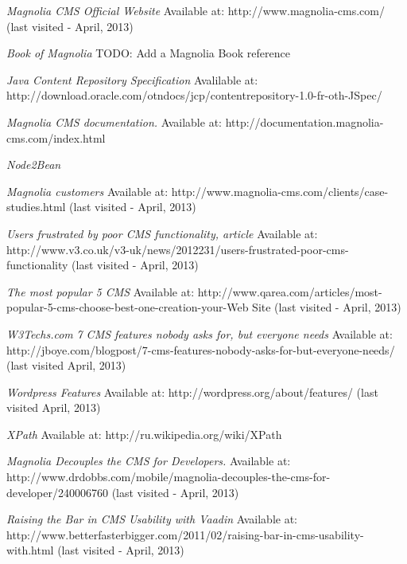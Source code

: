 \begin{thebibliography}{9}

\emph{Magnolia CMS Official Website}
Available at: http://www.magnolia-cms.com/ (last visited - April, 2013)

\emph{Book of Magnolia}
TODO: Add a Magnolia Book reference

\emph{Java Content Repository Specification}
Avalilable at: http://download.oracle.com/otndocs/jcp/contentrepository-1.0-fr-oth-JSpec/

\emph{Magnolia CMS documentation.} Available at: http://documentation.magnolia-cms.com/index.html
  
\emph{Node2Bean}

\emph{Magnolia customers} Available at: http://www.magnolia-cms.com/clients/case-studies.html (last visited - April, 2013)

\emph{Users frustrated by poor CMS functionality, article} 
Available at: http://www.v3.co.uk/v3-uk/news/2012231/users-frustrated-poor-cms-functionality (last visited - April, 2013)
  
\emph{The most popular 5 CMS} Available at: http://www.qarea.com/articles/most-popular-5-cms-choose-best-one-creation-your-Web Site (last visited - April, 2013)

\emph{W3Techs.com}
% 
\emph{7 CMS features nobody asks for, but everyone needs}
Available at: http://jboye.com/blogpost/7-cms-features-nobody-asks-for-but-everyone-needs/ (last visited April, 2013)

\emph{Wordpress Features}
Available at: http://wordpress.org/about/features/ (last visited April, 2013)

\emph{XPath} Available at: http://ru.wikipedia.org/wiki/XPath

\emph{Magnolia Decouples the CMS for Developers.} Available at: http://www.drdobbs.com/mobile/magnolia-decouples-the-cms-for-developer/240006760 (last visited - April, 2013)
 
\emph{Raising the Bar in CMS Usability with Vaadin} 
Available at: http://www.betterfasterbigger.com/2011/02/raising-bar-in-cms-usability-with.html (last visited - April, 2013)
  

\end{thebibliography}
